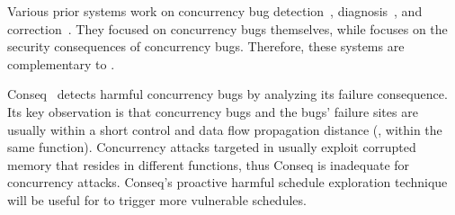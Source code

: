 
 Various prior systems work on 
concurrency bug 
detection~\cite{yu:racetrack:sosp,savage:eraser,racerx:sosp03,lu:muvi:sosp,
avio:asplos06,conmem:asplos10,conseq:asplos11,racemob:sosp13,
wester:parallelizing:asplos13},
diagnosis~\cite{racefuzzer:pldi08,
ctrigger:asplos09,atomfuzzer:fse08,xray:osdi12,gist:sosp15}, and
correction~\cite{dimmunix:osdi08,gadara:osdi08,wu:loom:osdi10,cfix:osdi12}.
They focused on concurrency bugs themselves, while \xxx focuses on the security 
consequences of concurrency bugs. Therefore, these systems are complementary to 
\xxx.


Conseq~\cite{conseq:asplos11} detects harmful concurrency bugs by analyzing its 
failure consequence. Its key observation is that concurrency bugs and the bugs' 
failure sites are usually within a short control and data flow propagation 
distance (\eg, within the same function). Concurrency attacks targeted in \xxx 
usually exploit corrupted memory that resides in different functions, thus 
Conseq is inadequate for concurrency attacks. Conseq's proactive harmful 
schedule exploration technique will be useful for \xxx to trigger more 
vulnerable schedules.


